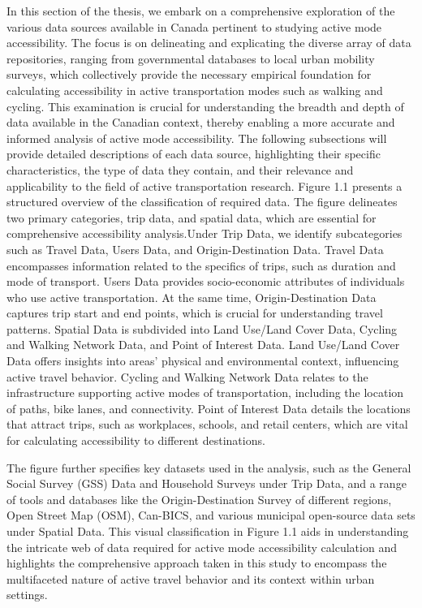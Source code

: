 \documentclass[
11pt, %
oneside, %
english, %
singlespacing, %
]{macthesis} %
\begin{document}
In this section of the thesis, we embark on a comprehensive exploration of the various data sources available in Canada pertinent to studying active mode accessibility. The focus is on delineating and explicating the diverse array of data repositories, ranging from governmental databases to local urban mobility surveys, which collectively provide the necessary empirical foundation for calculating accessibility in active transportation modes such as walking and cycling. This examination is crucial for understanding the breadth and depth of data available in the Canadian context, thereby enabling a more accurate and informed analysis of active mode accessibility. The following subsections will provide detailed descriptions of each data source, highlighting their specific characteristics, the type of data they contain, and their relevance and applicability to the field of active transportation research. Figure 1.1 presents a structured overview of the classification of required data. The figure delineates two primary categories, trip data, and spatial data, which are essential for comprehensive accessibility analysis.Under Trip Data, we identify subcategories such as Travel Data, Users Data, and Origin-Destination Data. Travel Data encompasses information related to the specifics of trips, such as duration and mode of transport. Users Data provides socio-economic attributes of individuals who use active transportation. At the same time, Origin-Destination Data captures trip start and end points, which is crucial for understanding travel patterns. Spatial Data is subdivided into Land Use/Land Cover Data, Cycling and Walking Network Data, and Point of Interest Data. Land Use/Land Cover Data offers insights into areas' physical and environmental context, influencing active travel behavior. Cycling and Walking Network Data relates to the infrastructure supporting active modes of transportation, including the location of paths, bike lanes, and connectivity. Point of Interest Data details the locations that attract trips, such as workplaces, schools, and retail centers, which are vital for calculating accessibility to different destinations.

The figure further specifies key datasets used in the analysis, such as the General Social Survey (GSS) Data and Household Surveys under Trip Data, and a range of tools and databases like the Origin-Destination Survey of different regions, Open Street Map (OSM), Can-BICS, and various municipal open-source data sets under Spatial Data. This visual classification in Figure 1.1 aids in understanding the intricate web of data required for active mode accessibility calculation and highlights the comprehensive approach taken in this study to encompass the multifaceted nature of active travel behavior and its context within urban settings.
\end{document}
